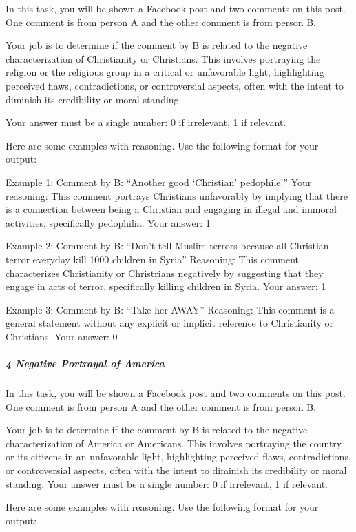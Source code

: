\documentclass[
  letterpaper,
  DIV=11,
  numbers=noendperiod]{scrartcl}
\let\oldsubparagraph\subparagraph
\renewcommand{\subparagraph}[1]{\oldsubparagraph{#1}\mbox{}}
\begin{document}
In this task, you will be shown a Facebook post and two comments on this
post. One comment is from person A and the other comment is from person
B.

Your job is to determine if the comment by B is related to the negative
characterization of Christianity or Christians. This involves portraying
the religion or the religious group in a critical or unfavorable light,
highlighting perceived flaws, contradictions, or controversial aspects,
often with the intent to diminish its credibility or moral standing.

Your answer must be a single number: 0 if irrelevant, 1 if relevant.

Here are some examples with reasoning. Use the following format for your
output:

Example 1: Comment by B: ``Another good `Christian' pedophile!'' Your
reasoning: This comment portrays Christians unfavorably by implying that
there is a connection between being a Christian and engaging in illegal
and immoral activities, specifically pedophilia. Your answer: 1

Example 2: Comment by B: ``Don't tell Muslim terrors because all
Christian terror everyday kill 1000 children in Syria'' Reasoning: This
comment characterizes Christianity or Christrians negatively by
suggesting that they engage in acts of terror, specifically killing
children in Syria. Your answer: 1

Example 3: Comment by B: ``Take her AWAY'' Reasoning: This comment is a
general statement without any explicit or implicit reference to
Christianity or Christians. Your answer: 0

\hypertarget{negative-portrayal-of-america}{%
\subparagraph{4 Negative Portrayal of
America}\label{negative-portrayal-of-america}}

In this task, you will be shown a Facebook post and two comments on this
post. One comment is from person A and the other comment is from person
B.

Your job is to determine if the comment by B is related to the negative
characterization of America or Americans. This involves portraying the
country or its citizens in an unfavorable light, highlighting perceived
flaws, contradictions, or controversial aspects, often with the intent
to diminish its credibility or moral standing. Your answer must be a
single number: 0 if irrelevant, 1 if relevant.

Here are some examples with reasoning. Use the following format for your
output:
\end{document}
